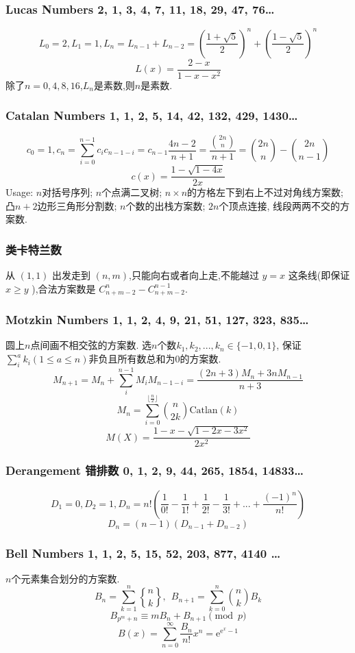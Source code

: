 \begin{small}
\subsubsection{Lucas Numbers 2, 1, 3, 4, 7, 11, 18, 29, 47, 76\dots}
\[ L_0=2,L_1=1,L_n=L_{n-1}+L_{n-2}=(\frac{1+\sqrt{5}}{2})^n+(\frac{1-\sqrt{5}}{2})^n \]
\[ L(x)=\frac{2-x}{1-x-x^2} \]
除了$n=0,4,8,16$,$L_n$是素数,则$n$是素数.
\subsubsection{Catalan Numbers 1, 1, 2, 5, 14, 42, 132, 429, 1430\dots}
\[c_{0}=1,c_n=\sum_{i=0}^{n-1}c_ic_{n-1-i}=c_{n-1}\frac{4n-2}{n+1}=\frac{\binom{2n}{n}}{n+1}=\binom{2n}{n}-\binom{2n}{n-1}\]
\[ c(x)=\frac{1-\sqrt{1-4x}}{2x}\]
Usage: $n$对括号序列; $n$个点满二叉树; $n\times n$的方格左下到右上不过对角线方案数; 凸$n+2$边形三角形分割数; $n$个数的出栈方案数; $2n$个顶点连接, 线段两两不交的方案数.
\subsubsection*{类卡特兰数}
从 $(1,1)$ 出发走到 $(n,m)$,只能向右或者向上走,不能越过 $y=x$ 这条线(即保证 $x\geq y$ ),合法方案数是 $C_{n+m-2}^{n} - C_{n+m-2}^{n-1}$.
\subsubsection{Motzkin Numbers 1, 1, 2, 4, 9, 21, 51, 127, 323, 835\dots}
圆上$n$点间画不相交弦的方案数. 选$n$个数$k_1,k_2,...,k_n\in\{-1,0,1\}$, 保证$\sum_i^ak_i(1\leq a\leq n)$非负且所有数总和为$0$的方案数. \[M_{n+1}=M_n+\sum_i^{n-1}M_iM_{n-1-i}=\frac{(2n+3)M_n+3nM_{n-1}}{n+3}\]
\[M_n=\sum_{i=0}^{\lfloor \frac{n}{2}\rfloor}\binom{n}{2k} \mathrm{Catlan}(k)\]
\[M(X)=\frac{1-x-\sqrt{1-2x-3x^2}}{2x^2}\]
\subsubsection{Derangement 错排数 0, 1, 2, 9, 44, 265, 1854, 14833\dots}
\[D_1=0,D_2=1,D_n=n!(\frac{1}{0!}-\frac{1}{1!}+\frac{1}{2!}-\frac{1}{3!}+...+\frac{(-1)^n}{n!})\]
\[D_n=(n-1)(D_{n-1}+D_{n-2})\]
\subsubsection{Bell Numbers 1, 1, 2, 5, 15, 52, 203, 877, 4140 \dots}
$n$个元素集合划分的方案数.
\[ B_n=\sum_{k=1}^{n}{n\brace k},\ \ B_{n+1} = \sum_{k=0}^n{n \choose k}B_k \]
\[ B_{p^m+n} \equiv mB_n+B_{n+1} \pmod{p} \]
\[B(x)=\sum_{n=0}^{\infty}\frac{B_n}{n!}x^n=\mathrm{e}^{\mathrm{e}^x-1}\]

\end{small}

